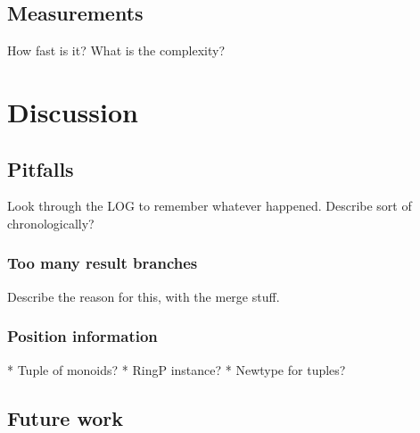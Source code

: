 \documentclass[a4paper,12pt,twosided]{report}
\begin{document}
\section{Measurements}
How fast is it? What is the complexity?

%
%
\chapter{Discussion}

\section{Pitfalls}
Look through the LOG to remember whatever happened. Describe sort of chronologically?

\subsection{Too many result branches}
Describe the reason for this, with the merge stuff.

\subsection{Position information}
* Tuple of monoids?
* RingP instance?
* Newtype for tuples?

\section{Future work}

%
%



%
%
\end{document}
